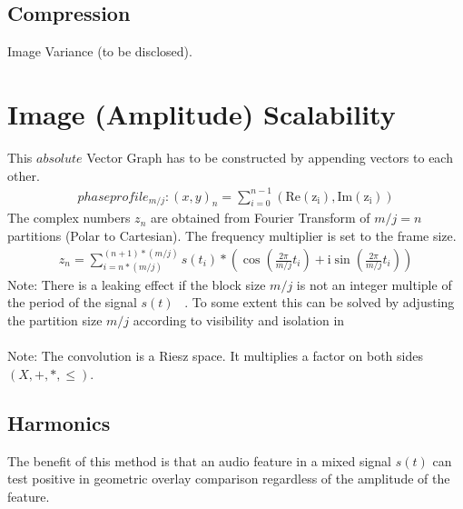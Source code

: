 \documentclass{report}
\begin{document}
\subsection{Compression}
Image Variance (to be disclosed).
\section{Image (Amplitude) Scalability}
This $absolute$ Vector Graph has to be constructed by appending vectors to each other.
\begin{align}
phaseprofile_{m/j}: (x,y)_{n}=\sum \limits _{i=0}^{n-1}(\mathrm{Re(z_{i})},\mathrm{Im(z_{i})})
\end{align}
The complex numbers $z_{n}$ are obtained from Fourier Transform of $m/j=n$ partitions (Polar to Cartesian). The frequency multiplier is set to the frame size.
\begin{align}
z_{n}= \sum \limits _{i=n*(m/j)}^{(n+1)*(m/j)} s(t_{i})*(\cos(\frac{2\pi}{m/j}t_{i})+\mathrm{i}\sin(\frac{2\pi}{m/j}t_{i}))\label{eq:3}
\end{align}
Note: There is a leaking effect if the block size $m/j$ is not an integer multiple of the period of the signal $s(t)$ ~\cite[Fensterfunktion]{Fensterfunktion}. To some extent this can be solved by adjusting the partition size $m/j$ according to visibility and isolation in ~\cite[Stopeight\_Comparator.tex]{Comparator}\\\\
Note: The convolution is a Riesz space. It multiplies a factor on both sides $(X,+,*,\leq)$.
\subsection{Harmonics}
The benefit of this method is that an audio feature in a mixed signal $s(t)$ can test positive in geometric overlay comparison regardless of the amplitude of the feature.

\iffalse
\printbibliography
\fi
{}

\end{document}
